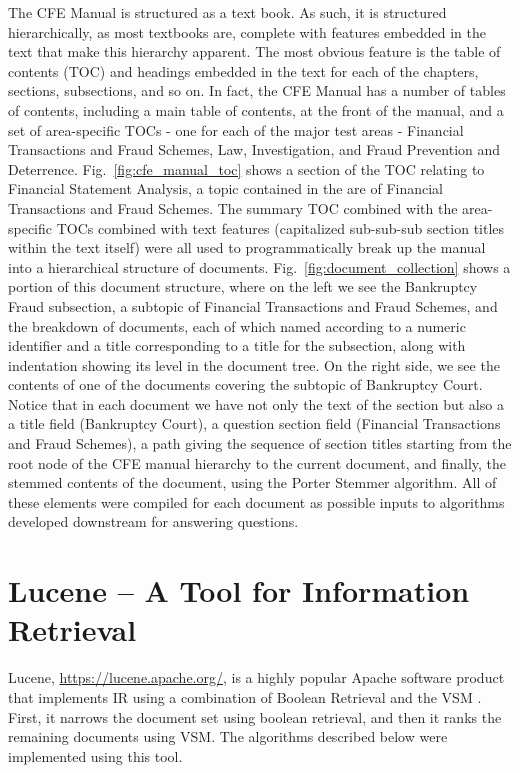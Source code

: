 The CFE Manual is structured as a text book. As such, it is structured hierarchically, as most textbooks are, complete with features embedded in the text that make this hierarchy apparent.  The most obvious feature is the table of contents (TOC) and headings embedded in the text for each of the chapters, sections, subsections, and so on.  In fact, the CFE Manual has a number of tables of contents, including a main table of contents, at the front of the manual, and a set of area-specific TOCs - one for each of the major test areas - Financial Transactions and Fraud Schemes, Law, Investigation, and Fraud Prevention and Deterrence.  Fig.~\ref{fig:cfe_manual_toc} shows a section of the TOC relating to Financial Statement Analysis, a topic contained in the are of Financial Transactions and Fraud Schemes.  The summary TOC combined with the area-specific TOCs combined with text features (capitalized sub-sub-sub section titles within the text itself) were all used to programmatically break up the manual into a hierarchical structure of documents.  Fig.~\ref{fig:document_collection} shows a portion of this document structure, where on the left we see the Bankruptcy Fraud subsection, a subtopic of Financial Transactions and Fraud Schemes, and the breakdown of documents, each of which named according to a numeric identifier and a title corresponding to a title for the subsection, along with indentation showing its level in the document tree.  On the right side, we see the contents of one of the documents covering the subtopic of Bankruptcy Court.  Notice that in each document we have not only the text of the section but also a a title field (Bankruptcy Court), a question section field (Financial Transactions and Fraud Schemes), a path giving the sequence of section titles starting from the root node of the CFE manual hierarchy to the current document, and finally, the stemmed contents of the document, using the Porter Stemmer algorithm.  All of these elements were compiled for each document as possible inputs to algorithms developed downstream for answering questions.  

\section{Lucene -- A Tool for Information Retrieval}

Lucene, \url{https://lucene.apache.org/}, is a highly popular Apache software product that implements IR using a combination of Boolean Retrieval and the VSM \cite{McCandless:2010:LAS:1893016_ch1,McCandless:2010:LAS:1893016_ch2,McCandless:2010:LAS:1893016_ch3,McCandless:2010:LAS:1893016_ch4}.  First, it narrows the document set using boolean retrieval, and then it ranks the remaining documents using VSM.  The algorithms described below were implemented using this tool.  

